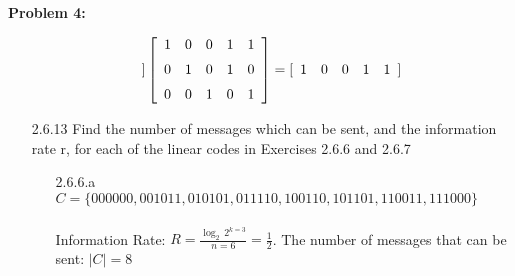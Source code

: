 \documentclass[11pt]{article}
\newenvironment{problem}[1]{\textbf{Problem #1: }}{\newpage}
\begin{document}
\begin{problem}{4}
\begin{itemize}
\[\begin{array}{ccc}
		\end{array}] \left[ \begin{array}{ccccc}
			1&0&0&1&1 \\
			\noalign{\medskip} 0&1&0&1&0 \\
			\noalign{\medskip} 0&0&1&0&1
		\end{array}\right] = [\begin{array}{ccccc}
		1&0&0&1&1
		\end{array}]\]
		\item[2.6.13]
		Find the number of messages which can be sent, and the information rate r, for each of the linear codes in Exercises 2.6.6 and 2.6.7
		\begin{itemize}
			\item[2.6.6.a] $C = \{000000, 001011,010101,011110, 100110, 101101, 110011, 111000\}$
			\\ \\
			Information Rate: $R = \frac{\log_2\,2^{k=3}}{n=6} = \frac{1}{2}$.  The number of messages that can be sent: $|C| = 8$
		\end{itemize}
		\end{itemize}
	\end{problem}
\end{document}
